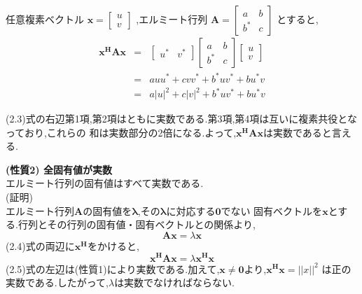 任意複素ベクトル
$
    \bm{x} = \left[
        \begin{array}{c}
            u \\
            v
        \end{array}
    \right]
$
,エルミート行列
$
    \bm{A} = \left[
        \begin{array}{cc}
            a & b \\
            b^* & c
        \end{array}
    \right]
$
とすると,
\begin{eqnarray}
    \bm{x^HAx} &=& 
    \left[
        \begin{array}{cc}
            u^* & v^*
        \end{array}
    \right]
    \left[
        \begin{array}{cc}
            a & b \\
            b^* & c
        \end{array}
    \right]
    \left[
        \begin{array}{c}
            u \\
            v
        \end{array}
    \right] \nonumber \\
    &=& auu^* + cvv^* + b^*uv^* + bu^*v \nonumber \\
    &=& a|u|^2+c|v|^2+b^*uv^*+bu^*v
\end{eqnarray}

\noindent(2.3)式の右辺第1項,第2項はともに実数である.第3項,第4項は互いに複素共役となっており,これらの
和は実数部分の2倍になる.よって,$\bm{x^HAx}$は実数であると言える.

\vspace{5mm}
\noindent\textbf{(性質2) \quad 全固有値が実数} \\
エルミート行列の固有値はすべて実数である. \\
\vspace{3mm}
(証明) \\
エルミート行列$\bm{A}$の固有値を$\bm{\lambda}$,その$\bm{\lambda}$に対応する$\bm{0}$でない
固有ベクトルを$\bm{x}$とする.行列とその行列の固有値・固有ベクトルとの関係より,
\begin{equation}
    \bm{Ax} = \lambda\bm{x}
\end{equation}
(2.4)式の両辺に$\bm{x^H}$をかけると,
\begin{equation}
    \bm{x^HAx} = \lambda\bm{x^Hx}
\end{equation}
(2.5)式の左辺は(性質1)により実数である.加えて,$\bm{x}\neq\bm{0}$より,$\bm{x^Hx}=||x||^2$
は正の実数である.したがって,$\lambda$は実数でなければならない.

